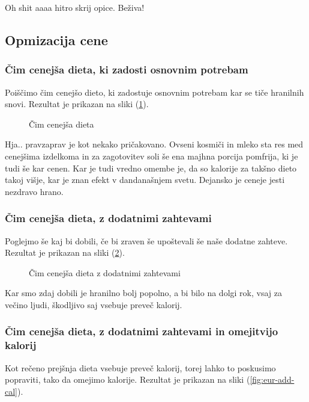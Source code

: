 \documentclass[a4paper]{article}
\begin{document}
Oh shit aaaa hitro skrij opice. Beživa!

\subsection{Opmizacija cene}
\subsubsection{Čim cenejša dieta, ki zadosti osnovnim potrebam}
Poiščimo čim cenejšo dieto, ki zadostuje osnovnim potrebam kar se tiče hranilnih 
snovi. Rezultat je prikazan na sliki (\ref{fig:eur}).

\begin{figure}[H]
    \centering
    \caption{Čim cenejša dieta}
    \label{fig:eur}
\end{figure}

Hja.. pravzaprav je kot nekako pričakovano. Ovseni kosmiči in mleko sta res med cenejšima 
izdelkoma in za zagotovitev soli še ena majhna porcija pomfrija, ki je tudi še kar cenen. Kar je
tudi vredno omembe je, da so kalorije za takšno dieto takoj višje, kar je znan efekt v dandanašnjem 
svetu. Dejansko je ceneje jesti nezdravo hrano.

\subsubsection{Čim cenejša dieta, z dodatnimi zahtevami}
Poglejmo še kaj bi dobili, če bi zraven še upoštevali še naše dodatne zahteve.
Rezultat je prikazan na sliki (\ref{fig:eur-add}).

\begin{figure}[H]
    \centering
    \caption{Čim cenejša dieta z dodatnimi zahtevami}
    \label{fig:eur-add}
\end{figure}

Kar smo zdaj dobili je hranilno bolj popolno, a bi bilo na dolgi rok, vsaj za večino ljudi,
škodljivo saj vsebuje preveč kalorij.

\subsubsection{Čim cenejša dieta, z dodatnimi zahtevami in omejitvijo kalorij}
Kot rečeno prejšnja dieta vsebuje preveč kalorij, torej lahko to poskusimo popraviti, tako da 
omejimo kalorije. Rezultat je prikazan na sliki (\ref{fig:eur-add-cal}).
\end{document}
